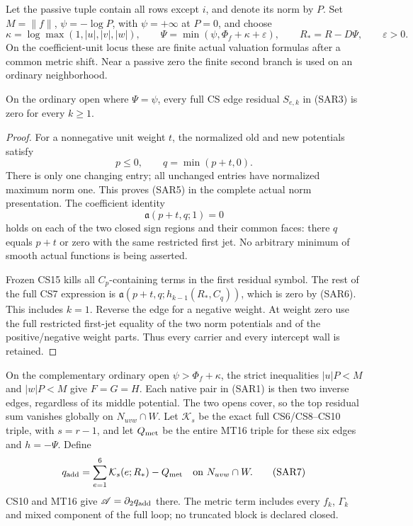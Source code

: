 Let the passive tuple contain all rows except $i$, and denote its
norm by $P$.  Set $M=\|f\|$, $\psi=-\log P$, with $\psi=+\infty$
at $P=0$, and choose
\[
 \kappa=\log\max(1,|u|,|v|,|w|),\qquad
 \Psi=\min(\psi,\Phi_f+\kappa+\varepsilon),\qquad
 R_*=R-D\Psi,\qquad \varepsilon>0.
 \tag{SAR4}
\]
On the coefficient-unit locus these are finite actual valuation
formulas after a common metric shift.  Near a passive zero the
finite second branch is used on an ordinary neighborhood.

\begin{lemma}
On the ordinary open where $\Psi=\psi$, every full CS edge residual
$S_{e,k}$ in (SAR3) is zero for every $k\ge1$.
\end{lemma}

\begin{proof}
For a nonnegative unit weight $t$, the normalized old and new
potentials satisfy
\[
                           p\le0,\qquad q=\min(p+t,0).
 \tag{SAR5}
\]
There is only one changing entry; all unchanged entries have
normalized maximum norm one.  This proves (SAR5) in the complete
actual norm presentation.  The coefficient identity
\[
                  \mathfrak a(p+t,q;1)=0
 \tag{SAR6}
\]
holds on each of the two closed sign regions and their common
faces: there $q$ equals $p+t$ or zero with the same restricted
first jet.  No arbitrary minimum of smooth actual functions is
being asserted.

Frozen CS15 kills all $C_p$-containing terms in the first residual
symbol.  The rest of the full CS7 expression is
$\mathfrak a(p+t,q;h_{k-1}(R_*,C_q))$, which is zero by (SAR6).
This includes $k=1$.  Reverse the edge for a negative weight.
At weight zero use the full restricted first-jet equality of the
two norm potentials and of the positive/negative weight parts.
Thus every carrier and every intercept wall is retained.
\end{proof}

On the complementary ordinary open $\psi>\Phi_f+\kappa$, the
strict inequalities $|u|P<M$ and $|w|P<M$ give $F=G=H$.
Each native pair in (SAR1) is then two inverse edges, regardless
of its middle potential.  The two opens cover, so the top residual
sum vanishes globally on $N_{uvw}\cap W$.  Let $\mathcal K_s$
be the exact full CS6/CS8--CS10 triple, with $s=r-1$, and let
$Q_{\rm met}$ be the entire MT16 triple for these six edges and
$h=-\Psi$.  Define
\[
          q_{\rm add}=\sum_{e=1}^6\mathcal K_s(e;R_*)-Q_{\rm met}
                 \quad\hbox{on }N_{uvw}\cap W.
 \tag{SAR7}
\]
CS10 and MT16 give $\mathscr A=\partial_2q_{\rm add}$ there.
The metric term includes every $f_k$, $\Gamma_k$ and mixed
component of the full loop; no truncated block is declared closed.

